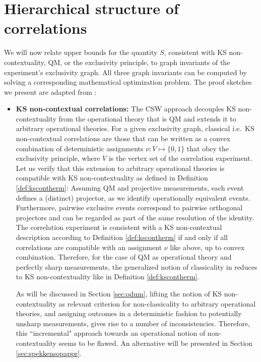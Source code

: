\section{Hierarchical structure of correlations}
\label{sec:cswhierarch}
We will now relate upper bounds for the quantity $S$, consistent with KS non-contextuality, QM, or the exclusivity principle, to graph invariants of the experiment's exclusivity graph. All three graph invariants can be computed by solving a corresponding mathematical optimization problem. The proof sketches we present are adapted from \cite{Cabello2014}:

\begin{itemize}
    \item \textbf{KS non-contextual correlations:}
    The CSW approach decouples KS non-contextuality from the operational theory that is QM and extends it to arbitrary operational theories. For a given exclusivity graph, classical i.e.\ KS non-contextual correlations are those that can be written as a convex combination of deterministic assignments $\nu: V\mapsto\{0,1\}$ that obey the exclusivity principle, where $V$ is the vertex set of the correlation experiment. Let us verify that this extension to arbitrary operational theories is compatible with KS non-contextuality as defined in Definition \ref{def:kscontherm}: Assuming QM and projective measurements, each event defines a (distinct) projector, as we identify operationally equivalent events. Furthermore, pairwise exclusive events correspond to pairwise orthogonal projectors and can be regarded as part of the same resolution of the identity. The correlation experiment is consistent with a KS non-contextual description according to Definition \ref{def:kscontherm} if and only if all correlations are compatible with an assignment $\nu$ like above, up to convex combination. Therefore, for the case of QM as operational theory and perfectly sharp measurements, the generalized notion of classicality in \cite{Cabello2014} reduces to KS non-contextuality like in Definition \ref{def:kscontherm}.
    
    As will be discussed in Section \ref{sec:odum}, lifting the notion of KS non-contextuality as relevant criterion for non-classicality to arbitrary operational theories, and assigning outcomes in a deterministic fashion to potentially unsharp measurements, gives rise to a number of inconsistencies. Therefore, this ``incremental" \cite{Pusey2019} approach towards an operational notion of non-contextuality seems to be flawed. An alternative will be presented in Section \ref{sec:spekkensopappr}.
    

\end{itemize}

